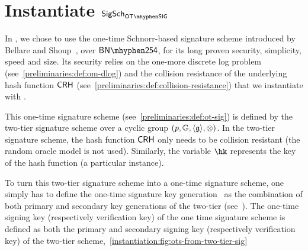 
\section{Instantiate $\sigscheme_{\otsig}$}\label{instantiation:otsig}

In \zeth, we chose to use the one-time Schnorr-based signature scheme introduced by Bellare and Shoup~\cite{bellare2007two}, over $\BNCurve$, for its long proven security, simplicity, speed and size. Its security relies on the one-more discrete log problem (see~\cref{preliminaries:def:om-dlog}) and the collision resistance of the underlying hash function $\mathsf{CRH}$ (see~\cref{preliminaries:def:collision-resistance}) that we instantiate with .

This one-time signature scheme (see~\cref{preliminaries:def:ot-sig}) is defined by the two-tier signature scheme over a cyclic group $(p, \mathbb{G}, \langle \mathfrak{g} \rangle, \otimes)$.
In the two-tier signature scheme, the hash function $\mathsf{CRH}$ only needs to be collision resistant (the random oracle model is not used). Similarly, the variable $\hk$ represents the key of the hash function (a particular instance).

To turn this two-tier signature scheme into a one-time signature scheme, one simply has to define the one-time signature key generation \kgen~as the combination of both primary and secondary key generations of the two-tier (see~\cite[Section 6]{bellare2007two}). The one-time signing key (respectively verification key) of the one time signature scheme is defined as both the primary and secondary signing key (respectively verification key) of the two-tier scheme,~\cref{instantiation:fig:ots-from-two-tier-sig}

